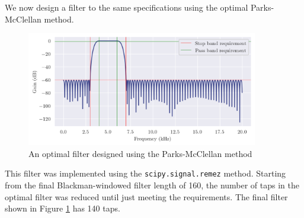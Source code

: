 We now design a filter to the same specifications using the optimal Parks-McClellan method.

\begin{figure}[ht]
    \centering
    \includegraphics[width=0.9\textwidth]{images/q3_optimal_freqz.png}
    \caption{An optimal filter designed using the Parks-McClellan method}
    \label{fig:q3_optimal_freqz}
\end{figure}

This filter was implemented using the \texttt{scipy.signal.remez} method. Starting from the final Blackman-windowed filter length of 160, the number of taps in the optimal filter was reduced until just meeting the requirements. The final filter shown in Figure \ref{fig:q3_optimal_freqz} has 140 taps.
